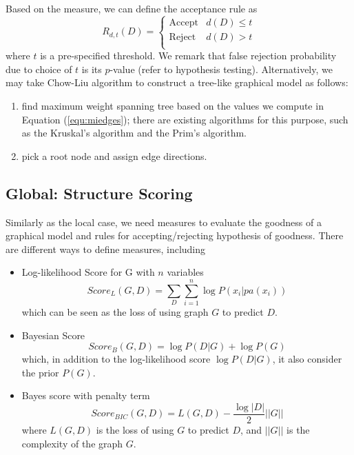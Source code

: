 Based on the measure,  we can define the acceptance rule as
\begin{equation}
    R_{d,t}(D)=
    \begin{cases}
    \text{Accept} & d(D) \leq t \\
    \text{Reject} & d(D) > t \\
    \end{cases}
\end{equation}
where $t$ is a pre-specified threshold. We remark that false rejection probability due to choice of $t$ is its $p$-value (refer to hypothesis testing). Alternatively, we may take Chow-Liu algorithm to construct a tree-like graphical model as follows: 
\begin{enumerate}
    \item find maximum weight spanning tree based on the values we compute in Equation (\ref{equ:miedges}); there are existing algorithms for this purpose, such as the Kruskal’s algorithm and the Prim’s algorithm. 
    \item pick a root node and assign edge directions.  
\end{enumerate}

\subsection*{Global: Structure Scoring}

Similarly as the local case, we need measures to evaluate the goodness of a graphical model and rules for accepting/rejecting hypothesis of goodness. 
%
There are different ways to define measures, including 
\begin{itemize}
    \item Log-likelihood Score for G with $n$ variables 
\begin{equation}
    Score_L(G,D) = \sum_{D}\sum_{i=1}^n \log P(x_i|pa(x_i))
\end{equation}
which can be seen as the loss of using graph $G$ to predict $D$. 
    \item Bayesian Score 
\begin{equation}
    Score_B(G,D) = \log P(D|G) + \log P(G)
\end{equation}
which, in addition to the log-likelihood score $\log P(D|G)$, it also consider the prior $P(G)$. 
    \item Bayes score with penalty term 
\begin{equation}
    Score_{BIC}(G,D) = L(G, D)- \frac{\log |D|}{2}||G||
\end{equation}
where $L(G, D)$ is the loss of using $G$ to predict $D$, and  $||G||$ is the complexity of the graph $G$. 
\end{itemize}


